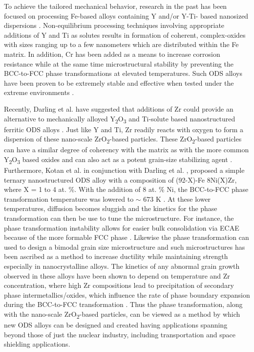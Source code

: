 	To achieve the tailored mechanical behavior, research in the past has been focused on processing Fe-based alloys containing Y and/or Y-Ti- based nanosized dispersions \cite{RN2661,RN1014}. Non-equilibrium processing techniques involving appropriate additions of Y and Ti as solutes results in formation of coherent, complex-oxides with sizes ranging up to a few nanometers which are distributed within the Fe matrix. In addition, Cr has been added as a means to increase corrosion resistance while at the same time microstructural stability by preventing the BCC-to-FCC phase transformations at elevated temperatures. Such ODS alloys have been proven to be extremely stable and effective when tested under the extreme environments \cite{RN1209}. 

	Recently, Darling et al. have suggested that additions of Zr could provide an alternative to mechanically alloyed Y\textsubscript{2}O\textsubscript{3} and Ti-solute based nanostructured ferritic ODS alloys \cite{RN650}. Just like Y and Ti, Zr readily reacts with oxygen to form a dispersion of these nano-scale ZrO\textsubscript{2}-based particles. These ZrO\textsubscript{2}-based particles can have a similar degree of coherency with the matrix as with the more common Y\textsubscript{2}O\textsubscript{3} based oxides \cite{RN153,RN739} and can also act as a potent grain-size stabilizing agent \cite{RN650}. Furthermore, Kotan et al. \cite{RN476,RN550} in conjunction with Darling et al. \cite{RN740}, proposed a simple ternary nanostructured ODS alloy with a composition of (92-X)-Fe 8Ni(X)Zr, where X = 1 to 4 at. \%. With the addition of 8 at. \% Ni, the BCC-to-FCC phase transformation temperature was lowered to $\sim$ 673 K \cite{RN476,RN550}. At these lower temperatures, diffusion becomes sluggish and the kinetics for the phase transformation can then be use to tune the microstructure. For instance, the phase transformation instability allows for easier bulk consolidation via ECAE because of the more formable FCC phase \cite{RN650}. Likewise the phase transformation can used to design a bimodal grain size microstructure \cite{RN858} and such microstructures has been ascribed as a method to increase ductility while maintaining strength especially in nanocrystalline alloys. The kinetics of any abnormal grain growth observed in these alloys have been shown to depend on temperature and Zr concentration, where high Zr compositions lead to precipitation of secondary phase intermetallics/oxides, which influence the rate of phase boundary expansion during the BCC-to-FCC transformation \cite{RN476}. Thus the phase transformation, along with the nano-scale ZrO\textsubscript{2}-based particles, can be viewed as a method by which new ODS alloys can be designed and created having applications spanning beyond those of just the nuclear industry, including transportation and space shielding applications. 
 
